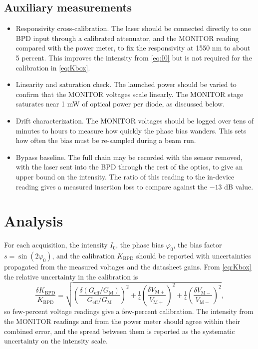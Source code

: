 \documentclass[11pt]{article}
\newcommand{\Iz}{I_{0}}
\newcommand{\phz}{\varphi_{0}}
\newcommand{\Vp}{V_{\mathrm{M+}}}
\newcommand{\Vm}{V_{\mathrm{M-}}}
\begin{document}
\subsection{Auxiliary measurements}
\begin{itemize}
  \item Responsivity cross-calibration. The laser should be connected directly to one
        BPD input through a calibrated attenuator, and the MONITOR reading compared with
        the power meter, to fix the responsivity at 1550 nm to about 5 percent. This
        improves the intensity from \eqref{eq:I0} but is not required for the
        calibration in \eqref{eq:Kbox}.
  \item Linearity and saturation check. The launched power should be varied to confirm
        that the MONITOR voltages scale linearly. The MONITOR stage saturates near 1 mW
        of optical power per diode, as discussed below.
  \item Drift characterization. The MONITOR voltages should be logged over tens of
        minutes to hours to measure how quickly the phase bias wanders. This sets how
        often the bias must be re-sampled during a beam run.
  \item Bypass baseline. The full chain may be recorded with the sensor removed, with
        the laser sent into the BPD through the rest of the optics, to give an upper
        bound on the intensity. The ratio of this reading to the in-device reading gives
        a measured insertion loss to compare against the $-13$ dB value.
\end{itemize}

\section{Analysis}

For each acquisition, the intensity $\Iz$, the phase bias $\phz$, the bias factor
$s = \sin(2\phz)$, and the calibration $K_{\mathrm{BPD}}$ should be reported with
uncertainties propagated from the measured voltages and the datasheet gains. From
\eqref{eq:Kbox} the relative uncertainty in the calibration is
\begin{equation}
  \frac{\delta K_{\mathrm{BPD}}}{K_{\mathrm{BPD}}}
   = \sqrt{\left(\frac{\delta(G_{\mathrm{eff}}/G_{\mathrm{M}})}{G_{\mathrm{eff}}/G_{\mathrm{M}}}\right)^{2}
   + \tfrac{1}{4}\left(\frac{\delta\Vp}{\Vp}\right)^{2}
   + \tfrac{1}{4}\left(\frac{\delta\Vm}{\Vm}\right)^{2}},
\end{equation}
so few-percent voltage readings give a few-percent calibration. The intensity from the
MONITOR readings and from the power meter should agree within their combined error, and
the spread between them is reported as the systematic uncertainty on the intensity
scale.
\end{document}
